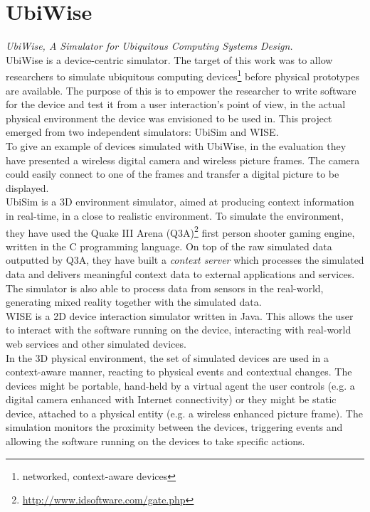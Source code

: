 \section{UbiWise}\label{sec:ubiwise}
\emph{UbiWise, A Simulator for Ubiquitous Computing Systems Design.}\\

UbiWise \cite{barton2003ubiwise} is a device-centric simulator. The target of this work was to allow researchers to simulate ubiquitous computing devices\footnote{networked, context-aware devices} before physical prototypes are available. The purpose of this is to empower the researcher to write software for the device and test it from a user interaction's point of view, in the actual physical environment the device was envisioned to be used in. This project emerged from two independent simulators: UbiSim and WISE.\\

To give an example of devices simulated with UbiWise, in the evaluation they have presented a wireless digital camera and wireless picture frames. The camera could easily connect to one of the frames and transfer a digital picture to be displayed.\\

UbiSim is a 3D environment simulator, aimed at producing context information in real-time, in a close to realistic environment. To simulate the environment, they have used the Quake III Arena (Q3A)\footnote{\url{http://www.idsoftware.com/gate.php}} first person shooter gaming engine, written in the C programming language. On top of the raw simulated data outputted by Q3A, they have built a \emph{context server} which processes the simulated data and delivers meaningful context data to external applications and services. The simulator is also able to process data from sensors in the real-world, generating mixed reality together with the simulated data.\\

WISE is a 2D device interaction simulator written in Java. This allows the user to interact with the software running on the device, interacting with real-world web services and other simulated devices.\\

In the 3D physical environment, the set of simulated devices are used in a context-aware manner, reacting to physical events and contextual changes. The devices might be portable, hand-held by a virtual agent the user controls (e.g. a digital camera enhanced with Internet connectivity) or they might be static device, attached to a physical entity (e.g. a wireless enhanced picture frame). The simulation monitors the proximity between the devices, triggering events and allowing the software running on the devices to take specific actions.\\

